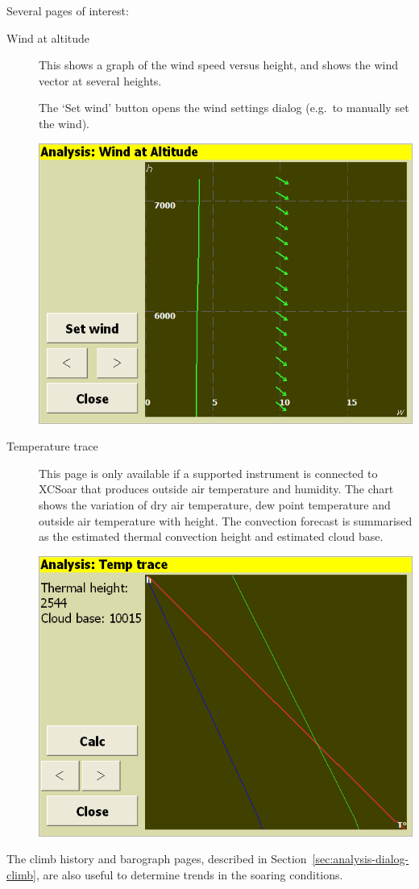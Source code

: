\documentclass[a4paper,12pt]{refrep}
\begin{document}
Several pages of interest:
\begin{description}

\item[Wind at altitude]
  This shows a graph of the wind speed versus height, and shows the
  wind vector at several heights.

The `Set wind' button opens the wind settings dialog (e.g.\ to
manually set the wind).

\begin{center}
\includegraphics[angle=0,width=0.8\linewidth,keepaspectratio='true']{figures/analysis-wind.png}
\end{center}

\item[Temperature trace]
  This page is only available if a supported instrument is connected
  to XCSoar that produces outside air temperature and humidity.  The
  chart shows the variation of dry air temperature, dew point
  temperature and outside air temperature with height.  The convection
  forecast is summarised as the estimated thermal convection height
  and estimated cloud base.

\begin{center}
\includegraphics[angle=0,width=0.8\linewidth,keepaspectratio='true']{figures/analysis-temptrace.png}
\end{center}

\end{description}
The climb history and barograph pages, described in
Section~\ref{sec:analysis-dialog-climb}, are also useful to determine
trends in the soaring conditions.
\end{document}

